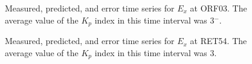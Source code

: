 \documentclass[linenumbers,draft]{agujournal}
\begin{document}

\begin{figure}[h]
\centering
\caption{Measured, predicted, and error time series for $E_x$ at ORF03. The average value of the $K_p$ index in this time interval was 3$^-$.}
\label{figure:ORF03}
\end{figure}
\begin{figure}[h]
\centering
\caption{Measured, predicted, and error time series for $E_x$ at RET54. The average value of the $K_p$ index in this time interval was 3.}
\label{figure:RET54}
\end{figure}
\end{document}
